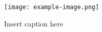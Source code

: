 \begin{figure}[h!]
  \centering
  \texttt{[image: example-image.png]}
  \caption{Insert caption here}
\end{figure}
